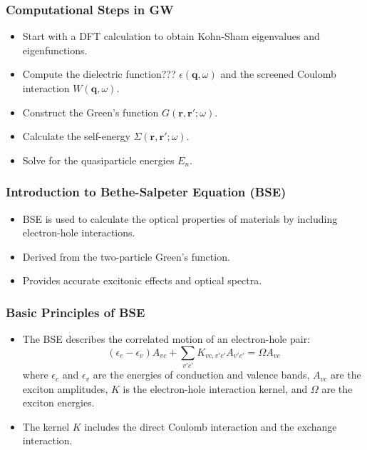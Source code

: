 \documentclass{CustomBeamer}
\begin{document}
        \begin{frame}
        \frametitle{Computational Steps in GW}
        \begin{itemize}
            \item Start with a DFT calculation to obtain Kohn-Sham eigenvalues and eigenfunctions.
            \item Compute the dielectric function??? $\epsilon(\mathbf{q}, \omega)$ and the screened Coulomb interaction $W(\mathbf{q}, \omega)$.
            \item Construct the Green's function $G(\mathbf{r}, \mathbf{r}'; \omega)$.
            \item Calculate the self-energy $\Sigma(\mathbf{r}, \mathbf{r}'; \omega)$.
            \item Solve for the quasiparticle energies $E_n$.
        \end{itemize}
        \end{frame}
        
        \begin{frame}
        \frametitle{Introduction to Bethe-Salpeter Equation (BSE)}
        \begin{itemize}
            \item BSE is used to calculate the optical properties of materials by including electron-hole interactions.
            \item Derived from the two-particle Green's function.
            \item Provides accurate excitonic effects and optical spectra.
        \end{itemize}
        \end{frame}
        
        \begin{frame}
        \frametitle{Basic Principles of BSE}
        \begin{itemize}
            \item The BSE describes the correlated motion of an electron-hole pair:
            \begin{equation}
            (\epsilon_c - \epsilon_v) A_{vc} + \sum_{v'c'} K_{vc,v'c'} A_{v'c'} = \Omega A_{vc}
            \end{equation}
            where $\epsilon_c$ and $\epsilon_v$ are the energies of conduction and valence bands, $A_{vc}$ are the exciton amplitudes, $K$ is the electron-hole interaction kernel, and $\Omega$ are the exciton energies.
            \item The kernel $K$ includes the direct Coulomb interaction and the exchange interaction.
        \end{itemize}
        \end{frame}
        
\end{document}
